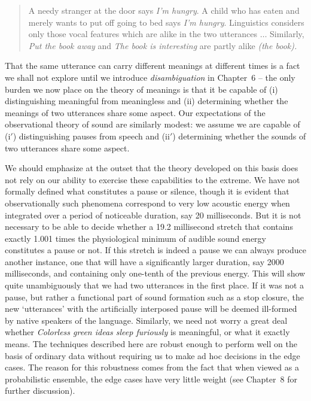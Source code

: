 \begin{quote}
A needy stranger at the door says {\it I'm hungry}. A child who has eaten and
merely wants to put off going to bed says {\it I'm hungry}. Linguistics
considers only those vocal features which are alike in the two utterances
$\ldots$ Similarly, {\it Put the book away} and {\it The book is interesting}
are partly alike {\it (the book).}
\end{quote}

That the same utterance can carry different meanings at different times is a
fact we shall not explore until we introduce {\it disambiguation} in Chapter~6
-- the only burden we now place on the theory of meanings is that it be
capable of (i) distinguishing meaningful from meaningless and (ii) determining
whether the meanings of two utterances share some aspect. Our expectations of
the observational theory of sound are similarly modest: we assume we are
capable of (i$'$) distinguishing pauses from speech and (ii$'$) determining
whether the sounds of two utterances share some aspect.

We should emphasize at the outset that the theory developed on this basis does
not rely on our ability to exercise these capabilities to the extreme. We have
not formally defined what constitutes a pause or silence, though it is evident
that observationally such phenomena correspond to very low acoustic energy
when integrated over a period of noticeable duration, say 20 milliseconds.
But it is not necessary to be able to decide whether a 19.2 millisecond
stretch that contains exactly 1.001 times the physiological minimum of audible
sound energy constitutes a pause or not. If this stretch is indeed a pause we
can always produce another instance, one that will have a significantly larger
duration, say 2000 milliseconds, and containing only one-tenth of the previous
energy. This will show quite unambiguously that we had two utterances in the
first place. If it was not a pause, but rather a functional part of sound
formation such as a stop closure, the new `utterances' with the artificially
interposed pause will be deemed ill-formed by native speakers of the language.
 Similarly, we need not worry a great deal whether {\it Colorless
  green ideas sleep furiously} is meaningful, or what it exactly means. The
techniques described here are robust enough to perform well on the basis of
ordinary data without requiring us to make ad hoc decisions in the edge cases.
The reason for this robustness comes from the fact that when viewed as a
probabilistic ensemble, the edge cases have very little weight (see Chapter~8
for further discussion).

